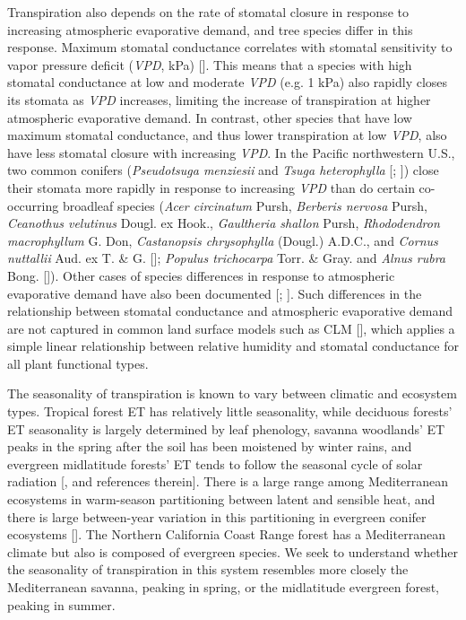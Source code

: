 Transpiration also depends on the rate of stomatal closure in response to increasing atmospheric evaporative demand, and tree species differ in this response.  Maximum stomatal conductance correlates with stomatal sensitivity to vapor pressure deficit (\textit{VPD}, kPa) [\cite{oren1999survey}].  This means that a species with high stomatal conductance at low and moderate \textit{VPD} (e.g. 1 kPa) also rapidly closes its stomata as \textit{VPD} increases, limiting the increase of transpiration at higher atmospheric evaporative demand.  In contrast, other species that have low maximum stomatal conductance, and thus lower transpiration at low \textit{VPD}, also have less stomatal closure with increasing \textit{VPD}.  In the Pacific northwestern U.S., two common conifers (\textit{Pseudotsuga menziesii} and \textit{Tsuga heterophylla} [\cite{marshall1984conifers}; \cite{bond1999stomatal}]) close their stomata more rapidly in response to increasing \textit{VPD} than do certain co-occurring broadleaf species (\textit{Acer circinatum} Pursh, \textit{Berberis nervosa} Pursh, \textit{Ceanothus velutinus} Dougl. ex Hook., \textit{Gaultheria shallon} Pursh, \textit{Rhododendron macrophyllum} G. Don, \textit{Castanopsis chrysophylla} (Dougl.) A.D.C., and \textit{Cornus nuttallii} Aud. ex T. \& G. [\cite{marshall1984conifers}]; \textit{Populus trichocarpa} Torr. \& Gray. and \textit{Alnus rubra} Bong. [\cite{bond1999stomatal}]).  Other cases of species differences in response to atmospheric evaporative demand have also been documented [\cite{aranda2000water}; \cite{martinez2003sap}].  Such differences in the relationship between stomatal conductance and atmospheric evaporative demand are not captured in common land surface models such as CLM [\cite{oleson2010technical}], which applies a simple linear relationship between relative humidity and stomatal conductance for all plant functional types.

The seasonality of transpiration is known to vary between climatic and ecosystem types.  Tropical forest ET has relatively little seasonality, while deciduous forests' ET seasonality is largely determined by leaf phenology, savanna woodlands' ET peaks in the spring after the soil has been moistened by winter rains, and evergreen midlatitude forests' ET tends to follow the seasonal cycle of solar radiation [\cite{baldocchi2011synthesis}, and references therein].  There is a large range among Mediterranean ecosystems in warm-season partitioning between latent and sensible heat, and there is large between-year variation in this partitioning in evergreen conifer ecosystems [\cite{wilson2002energy}].  The Northern California Coast Range forest has a Mediterranean climate but also is composed of evergreen species.  We seek to understand whether the seasonality of transpiration in this system resembles more closely the Mediterranean savanna, peaking in spring, or the midlatitude evergreen forest, peaking in summer.

